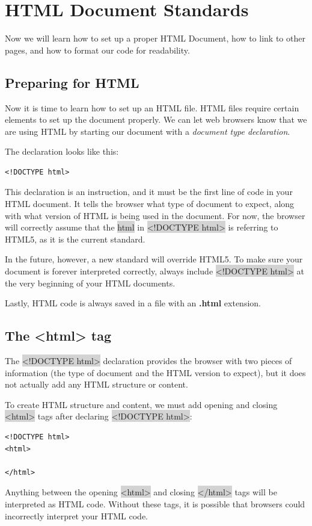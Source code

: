 \documentclass[11pt]{article}
\begin{document}
\newpage
\section{HTML Document Standards}
Now we will learn how to set up a proper HTML Document, how to link to other pages, and how to format our code for readability.
\subsection{Preparing for HTML}
Now it is time to learn how to set up an HTML file. HTML files require certain elements to set up the document properly. We can let web browsers know that we are using HTML by starting our document with a \textit{document type declaration}.

The declaration looks like this:
\begin{lstlisting}
<!DOCTYPE html>
\end{lstlisting}
This declaration is an instruction, and it must be the first line of code in your HTML document. It tells the browser what type of document to expect, along with what version of HTML is being used in the document. For now, the browser will correctly assume that the \colorbox{lightgray}{html} in \colorbox{lightgray}{<!DOCTYPE html>} is referring to HTML5, as it is the current standard.

In the future, however, a new standard will override HTML5. To make sure your document is forever interpreted correctly, always include \colorbox{lightgray}{<!DOCTYPE html>} at the very beginning of your HTML documents.

Lastly, HTML code is always saved in a file with an \textbf{.html} extension.

\subsection{The <html> tag}
The \colorbox{lightgray}{<!DOCTYPE html>} declaration provides the browser with two pieces of information (the type of document and the HTML version to expect), but it does not actually add any HTML structure or content.

To create HTML structure and content, we must add opening and closing \colorbox{lightgray}{<html>} tags after declaring \colorbox{lightgray}{<!DOCTYPE html>}:
\begin{lstlisting}
<!DOCTYPE html>
<html>

</html>
\end{lstlisting}
Anything between the opening \colorbox{lightgray}{<html>} and closing \colorbox{lightgray}{</html>} tags will be interpreted as HTML code. Without these tags, it is possible that browsers could incorrectly interpret your HTML code.
\end{document}
